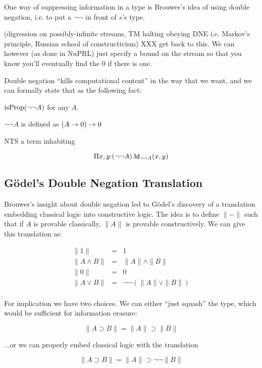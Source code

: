 \documentclass[11pt]{article}
\begin{document}
One way of suppressing information in a type is Brouwer's idea of using
double negation, i.e. to put a $\lnot\lnot$ in front of $s$'s type. 

(digression on possibly-infinite streams, TM halting obeying DNE i.e.
Markov's principle, Russian school of constructivism) XXX get back to this.
We can however (as done in NuPRL) just specify a bound on the stream so
that you know you'll eventually find the 0 if there is one.

Double negation ``kills computational content'' in the way that we want,
and we can formally state that as the following fact:

$\operatorname{isProp}(\lnot\lnot A)$ for any $A$.

$\lnot\lnot A$ is defined as $(A\to 0) \to 0$

NTS a term inhabiting

\[
\Pi{x,y}{:}(\lnot\lnot A).\mathsf{Id}_{\lnot\lnot A}(x,y)
\]


\subsection{G{\"o}del's Double Negation Translation}
\newcommand{\dnt}[1]{{\parallel}{#1}{\parallel}}
\renewcommand{\implies}{\supset}

Brouwer's insight about double negation led to G{\"o}del's discovery of a
translation embedding classical logic into constructive logic.  The idea is
to define $\dnt{-}$ such that if $A$ is provable classically, $\dnt{A}$ is
provable constructively. We can give this translation as:

\begin{eqnarray*}
\dnt{1}           &=& 1\\
\dnt{A\land B}    &=& \dnt{A} \land \dnt{B}\\
\dnt{0}           &=& 0\\
\dnt{A\lor B}     &=& \lnot\lnot(\dnt{A} \lor \dnt{B})\\
\end{eqnarray*}

For implication we have two choices. We can either ``just squash'' the
type, which would be sufficient for information erasure:

\[
\dnt{A\implies B} = \dnt{A} \implies \dnt{B}
\]

...or we can properly embed classical logic with the translation

\[
\dnt{A\implies B} = \dnt{A} \implies \lnot\lnot\dnt{B}
\]
\end{document}
